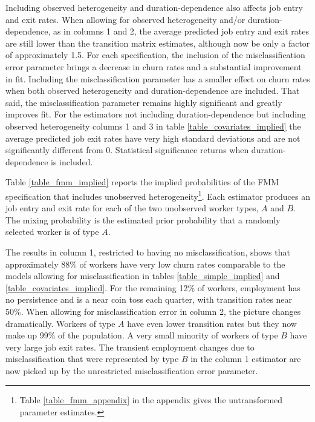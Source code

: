 \documentclass[letterpaper,12pt,final,dvipsnames]{article}
\begin{document}
Including observed heterogeneity and duration-dependence also affects job entry and exit rates. When allowing for observed heterogeneity and/or duration-dependence, as in columns 1 and 2, the average predicted job entry and exit rates are still lower than the transition matrix estimates, although now be only a factor of approximately 1.5. For each specification, the inclusion of the misclassification error parameter brings a decrease in churn rates and a substantial improvement in fit. Including the misclassification parameter has a smaller effect on churn rates when both observed heterogeneity and duration-dependence are included. That said, the misclassification parameter remains highly significant and greatly improves fit. For the estimators not including duration-dependence but including observed heterogeneity \textemdash columns 1 and 3 in table \ref{table_covariates_implied} \textemdash the average predicted job exit rates have very high standard deviations and are not significantly different from 0. Statistical significance returns when duration-dependence is included. 




Table \ref{table_fmm_implied} reports the implied probabilities of the FMM specification that includes unobserved heterogeneity\footnote{Table \ref{table_fmm_appendix} in the appendix gives the untransformed parameter estimates.}. Each estimator produces an job entry and exit rate for each of the two unobserved worker types, $A$ and $B$. The mixing probability is the estimated prior probability that a randomly selected worker is of type $A$. 

The results in column 1, restricted to having no misclassification, shows that approximately 88\% of workers have very low churn rates comparable to the models allowing for misclassification in tables \ref{table_simple_implied} and \ref{table_covariates_implied}. For the remaining 12\% of workers, employment has no persistence and is a near coin toss each quarter, with transition rates near 50\%. When allowing for misclassification error in column 2, the picture changes dramatically. Workers of type $A$ have even lower transition rates but they now make up 99\% of the population. A very small minority of workers of type $B$ have very large job exit rates. The transient employment changes due to misclassification that were represented by type $B$ in the column 1 estimator are now picked up by the unrestricted misclassification error parameter.
\end{document}
